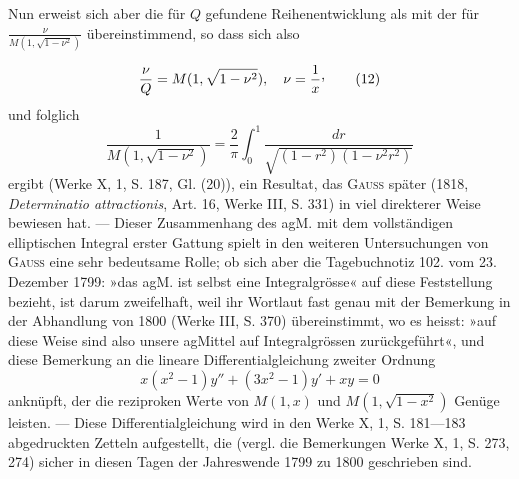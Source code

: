 Nun erweist sich aber die für \(Q\) gefundene Reihenentwicklung als mit der
für \(\frac\nu{M(1,\sqrt{1-\nu^2})}\) übereinstimmend, so dass sich also\par
\clearpage{}
\begingroup\makeatletter\tagsleft@true\let\veqno\leqno\makeatother
\begin{equation*}
\frac\nu Q=M(1,\sqrt{1-\nu^2}),\quad\nu=\frac1x\mathpunct{\vcenter{\hbox{,}}}\tag*{(12)}
\end{equation*}
\noindent und folglich
\begin{equation*}
\frac1{M(1,\sqrt{1-\nu^2})}=\frac2\pi\int_0^1\frac{dr}{\sqrt{(1-r^2)(1-\nu^2r^2)}}\tag*{(13)}
\end{equation*}
\noindent ergibt (Werke X, 1, S. 187, Gl. (20)), ein Resultat, das \textsc{Gauss} später (1818,
\textit{Determinatio attractionis}, Art. 16, Werke III, S. 331) in viel direkterer Weise
bewiesen hat. — Dieser Zusammenhang des agM. mit dem vollständigen elliptischen
Integral erster Gattung spielt in den weiteren Untersuchungen von
\textsc{Gauss} eine sehr bedeutsame Rolle; ob sich aber die Tagebuchnotiz 102. vom
23. Dezember 1799: »das agM. ist selbst eine Integralgrösse« auf diese Feststellung
bezieht, ist darum zweifelhaft, weil ihr Wortlaut fast genau mit der
Bemerkung in der Abhandlung von 1800 (Werke III, S. 370) übereinstimmt,
wo es heisst: »auf diese Weise sind also unsere agMittel auf Integralgrössen
zurückgeführt«, und diese Bemerkung an die lineare Differentialgleichung zweiter
Ordnung
\begin{equation*}
x(x^2-1)y''+(3x^2-1)y'+xy=0\tag*{(14)}
\end{equation*}
\noindent anknüpft, der die reziproken Werte von \(M(1,x)\) und \(M(1,\sqrt{1-x^2})\) Genüge
leisten. — Diese Differentialgleichung wird in den Werke X, 1, S. 181—183
abgedruckten Zetteln aufgestellt, die (vergl. die Bemerkungen Werke X, 1,
S. 273, 274) sicher in diesen Tagen der Jahreswende 1799 zu 1800 geschrieben
sind.

